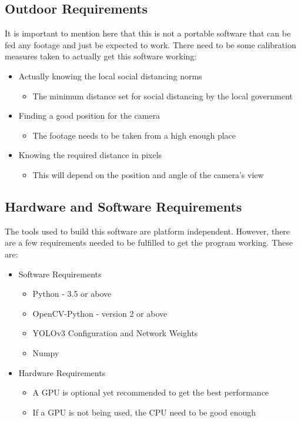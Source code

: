 \documentclass[a4paper]{article}
\begin{document}
\subsection{Outdoor Requirements}
It is important to mention here that this is not a portable software that can
be fed any footage and just be expected to work. There need to be some
calibration measures taken to actually get this software working:

\begin{itemize}
    \item Actually knowing the local social distancing norms
          \begin{itemize}
              \item The minimum distance set for social distancing by the local government
          \end{itemize}

    \item Finding a good position for the camera
          \begin{itemize}
              \item The footage needs to be taken from a high enough place
          \end{itemize}

    \item Knowing the required distance in pixels
          \begin{itemize}
              \item This will depend on the position and angle of the camera's view
          \end{itemize}
\end{itemize}

\subsection{Hardware and Software Requirements}
The tools used to build this software are platform independent. However,
there are a few requirements needed to be fulfilled to get the program
working. These are:

\begin{itemize}
    \item Software Requirements
          \begin{itemize}
              \item Python - 3.5 or above
              \item OpenCV-Python - version 2 or above
              \item YOLOv3 Configuration and Network Weights
              \item Numpy
          \end{itemize}

    \item Hardware Requirements
          \begin{itemize}
              \item A GPU is optional yet recommended to get the best performance
              \item If a GPU is not being used, the CPU need to be good enough
          \end{itemize}
\end{itemize}
\end{document}
